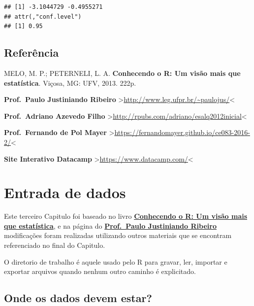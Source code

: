 \documentclass[]{book}
\newenvironment{Shaded}{\begin{snugshade}}{\end{snugshade}}
\newcommand{\CommentTok}[1]{\textcolor[rgb]{0.56,0.35,0.01}{\textit{#1}}}
\newcommand{\NormalTok}[1]{#1}
\newcommand{\OperatorTok}[1]{\textcolor[rgb]{0.81,0.36,0.00}{\textbf{#1}}}
\begin{document}
\begin{Shaded}
\end{Shaded}

\begin{verbatim}
## [1] -3.1044729 -0.4955271
## attr(,"conf.level")
## [1] 0.95
\end{verbatim}

\hypertarget{referencia-1}{%
\section{Referência}\label{referencia-1}}

MELO, M. P.; PETERNELI, L. A. \textbf{Conhecendo o R: Um visão mais que estatística}. Viçosa, MG: UFV, 2013. 222p.

\textbf{Prof.~Paulo Justiniando Ribeiro} \textgreater{}\url{http://www.leg.ufpr.br/~paulojus/}\textless{}

\textbf{Prof.~Adriano Azevedo Filho} \textgreater{}\url{http://rpubs.com/adriano/esalq2012inicial}\textless{}

\textbf{Prof.~Fernando de Pol Mayer} \textgreater{}\url{https://fernandomayer.github.io/ce083-2016-2/}\textless{}

\textbf{Site Interativo Datacamp} \textgreater{}\url{https://www.datacamp.com/}\textless{}

\hypertarget{entrada-de-dados}{%
\chapter{Entrada de dados}\label{entrada-de-dados}}

Este terceiro Capitulo foi baseado no livro \href{https://www.editoraufv.com.br/produto/conhecendo-o-r-uma-visao-mais-que-estatistica/1109294}{\textbf{Conhecendo o R: Um visão mais que estatística}}, e na página do \href{http://www.leg.ufpr.br/~paulojus/}{\textbf{Prof.~Paulo Justiniando Ribeiro}} modificações foram realizadas utilizando outros materiais que se encontram referenciado no final do Capitulo.

O diretorio de trabalho é aquele usado pelo R para gravar, ler, importar e exportar arquivos quando nenhum outro caminho é explicitado.

\hypertarget{onde-os-dados-devem-estar}{%
\section{Onde os dados devem estar?}\label{onde-os-dados-devem-estar}}
\end{document}
